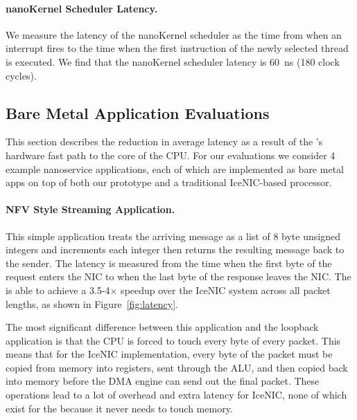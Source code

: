 
\paragraph{nanoKernel Scheduler Latency.} We measure the latency of the nanoKernel scheduler as the time from when an interrupt fires to the time when the first instruction of the newly selected thread is executed.
We find that the nanoKernel scheduler latency is \SI{60}{ns} (180 clock cycles).

\subsection{Bare Metal Application Evaluations}
\label{ssec:bare-metal-evals}
This section describes the reduction in average latency as a result of the \name{}'s hardware fast path to the core of the CPU.
For our evaluations we consider 4 example nanoservice applications, each of which are implemented as bare metal apps on top of both our \name{} prototype and a traditional IceNIC-based processor.

\paragraph{NFV Style Streaming Application.} This simple application treats the arriving message as a list of 8 byte unsigned integers and increments each integer then returns the resulting message back to the sender.
The latency is measured from the time when the first byte of the request enters the NIC to when the last byte of the response leaves the NIC.
The \name{} is able to achieve a 3.5-4$\times$ speedup over the IceNIC system across all packet lengths, as shown in Figure~\ref{fig:latency}.

The most significant difference between this application and the loopback application is that the CPU is forced to touch every byte of every packet.
This means that for the IceNIC implementation, every byte of the packet must be copied from memory into registers, sent through the ALU, and then copied back into memory before the DMA engine can send out the final packet.
These operations lead to a lot of overhead and extra latency for IceNIC, none of which exist for the \name{} because it never needs to touch memory.


